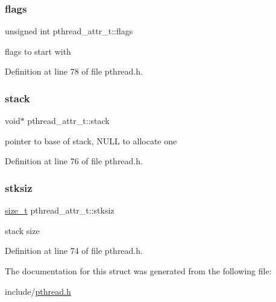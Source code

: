 \subsubsection{\texorpdfstring{flags}{flags}}
{\footnotesize\ttfamily unsigned int pthread\+\_\+attr\+\_\+t\+::flags}



flags to start with 



Definition at line 78 of file pthread.\+h.

\mbox{\label{structpthread__attr__t_a47a8348284e6b8101fe23d6139f3e625}} 
\subsubsection{\texorpdfstring{stack}{stack}}
{\footnotesize\ttfamily void$\ast$ pthread\+\_\+attr\+\_\+t\+::stack}



pointer to base of stack, N\+U\+LL to allocate one 



Definition at line 76 of file pthread.\+h.

\mbox{\label{structpthread__attr__t_ac10c79a6ec0a30ab5f839048b7b99a4f}} 
\subsubsection{\texorpdfstring{stksiz}{stksiz}}
{\footnotesize\ttfamily \mbox{\hyperlink{size__t_8h_aa9d55e2f20e580b7445617d0d12fff6e}{size\+\_\+t}} pthread\+\_\+attr\+\_\+t\+::stksiz}



stack size 



Definition at line 74 of file pthread.\+h.



The documentation for this struct was generated from the following file\+:\begin{DoxyCompactItemize}
\item 
include/\mbox{\hyperlink{pthread_8h}{pthread.\+h}}\end{DoxyCompactItemize}
